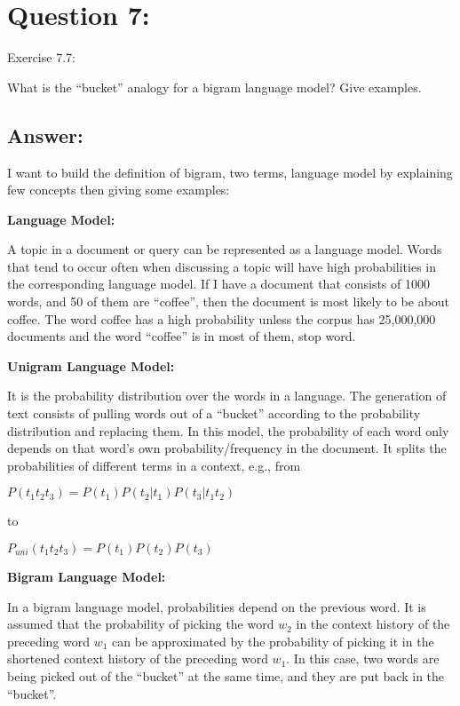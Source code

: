 \section*{Question 7:}
Exercise 7.7: 

What is the ``bucket'' analogy for a bigram language model? Give examples.

\subsection*{Answer:}

I want to build the definition of bigram, two terms, language model by explaining few concepts then giving some examples:
 
\textbf{Language Model:}

A topic in a document or query can be represented as a language model. Words that tend to occur often when discussing a topic will have high probabilities in the corresponding language model. If I have a document that consists of 1000 words, and 50 of them are ``coffee'', then the document is most likely to be about coffee. The word coffee has a high probability unless the corpus has 25,000,000 documents and the word ``coffee'' is in most of them, stop word.

\textbf{Unigram Language Model:}

It is the probability distribution over the words in a language. The generation of text consists of pulling words out of a ``bucket'' according to the probability distribution and replacing them. In this model, the probability of each word only depends on that word's own probability/frequency in the document. It splits the probabilities of different terms in a context, e.g., from

$P(t_1 t_2 t_3) = P(t_1) P(t_2|t_1) P(t_3|t_1 t_2)$

to

$P_{uni}(t_1 t_2 t_3) = P(t_1) P(t_2) P(t_3)$

 

\textbf{Bigram Language Model:}

In a bigram language model, probabilities depend on the previous word. It is assumed that the probability of picking the word $w_2$ in the context history of the preceding word $w_1$ can be approximated by the probability of picking it in the shortened context history of the preceding word $w_1$. In this case, two words are being picked out of the ``bucket'' at the same time, and they are put back in the ``bucket''. 

